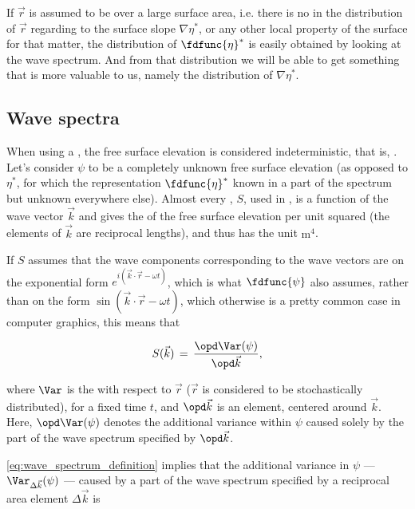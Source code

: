 If $\vec{r}$ is assumed to be  over a large surface area, i.e. there is no \bias in the distribution of $\vec{r}$ regarding to the surface slope $\nabla\eta^*$, or any other local property of the surface for that matter, the distribution of $\fdfunc{\eta}^*$ is easily obtained by looking at the wave spectrum. And from that distribution we will be able to get something that is more valuable to us, namely the distribution of $\nabla\eta^*$.

\subsection{Wave spectra}

When using a , the free surface elevation is considered indeterministic, that is, \stochastic. Let's consider $\psi$ to be a completely unknown free surface elevation (as opposed to $\eta^*$, for which the  representation $\fdfunc{\eta}^*$ known in a part of the spectrum but unknown everywhere else). Almost every , $S$, used in , is a function of the wave vector $\vec{k}$ and gives the \variance of the free surface elevation per unit  squared (the elements of $\vec{k}$ are reciprocal lengths), and thus has the unit $\text{m}^4$. 

If $S$ assumes that the wave components corresponding to the wave vectors are on the exponential form $e^{i(\vec{k}\cdot\vec{r}-\omega t)}$, which is what $\fdfunc{\psi}$ also assumes, rather than on the \sinusoidal form $\sin(\vec{k}\cdot\vec{r}-\omega t)$, which otherwise is a pretty common case in computer graphics, this means that

\begin{equation} \label{eq:wave_spectrum_definition}
S(\vec{k}) \,=\, \frac{\opd \Var(\psi)}{\opd\vec{k}},
\end{equation}

where $\Var$ is the  with respect to $\vec{r}$ ($\vec{r}$ is considered to be stochastically distributed), for a fixed time $t$, and $\opd\vec{k}$ is an \infinitesimal {} element, centered around $\vec{k}$. Here, $\opd\Var(\psi)$ denotes the additional variance within $\psi$ caused solely by the part of the wave spectrum specified by $\opd\vec{k}$.

\eqref{eq:wave_spectrum_definition} implies that the additional variance in $\psi$ --- $\Var_{\Delta\vec{k}}(\psi)$ --- caused by a part of the wave spectrum specified by a reciprocal area element $\Delta\vec{k}$ is

